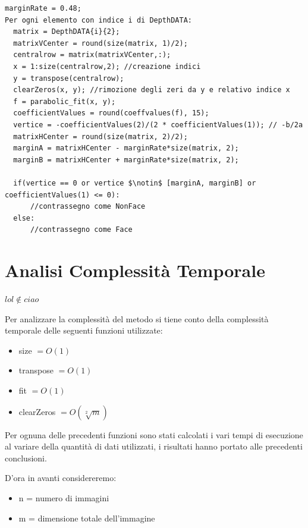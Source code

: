 \documentclass[
  italian,
]{article}
\providecommand{\tightlist}{%
  \setlength{\itemsep}{0pt}\setlength{\parskip}{0pt}}
\begin{document}
\begin{lstlisting}[basicstyle=\small, mathescape=true]
marginRate = 0.48;
Per ogni elemento con indice i di DepthDATA:
  matrix = DepthDATA{i}{2}; 
  matrixVCenter = round(size(matrix, 1)/2);
  centralrow = matrix(matrixVCenter,:);
  x = 1:size(centralrow,2); //creazione indici
  y = transpose(centralrow);
  clearZeros(x, y); //rimozione degli zeri da y e relativo indice x
  f = parabolic_fit(x, y);
  coefficientValues = round(coeffvalues(f), 15);
  vertice = -coefficientValues(2)/(2 * coefficientValues(1)); // -b/2a
  matrixHCenter = round(size(matrix, 2)/2);
  marginA = matrixHCenter - marginRate*size(matrix, 2);
  marginB = matrixHCenter + marginRate*size(matrix, 2);
  
  if(vertice == 0 or vertice $\notin$ [marginA, marginB] or coefficientValues(1) <= 0):
      //contrassegno come NonFace
  else:
      //contrassegno come Face
\end{lstlisting}


\hypertarget{analisi-complessituxe0-temporale}{%
\section{Analisi Complessità
Temporale}\label{analisi-complessituxe0-temporale}}

$lol \notin ciao$

Per analizzare la complessità del metodo si tiene conto della
complessità temporale delle seguenti funzioni utilizzate:

\begin{itemize}
\tightlist
\item
  size \(= O(1)\)
\item
  transpose \(= O(1)\)
\item
  fit \(= O(1)\)
\item
  clearZeros \(= O(\sqrt[2]{m}) \)
\end{itemize}

Per ognuna delle precedenti funzioni sono stati calcolati i vari tempi
di esecuzione al variare della quantità di dati utilizzati, i risultati
hanno portato alle precedenti conclusioni.

D'ora in avanti considereremo:

\begin{itemize}
\tightlist
\item
  n = numero di immagini
\item
  m = dimensione totale dell'immagine
\end{itemize}
\end{document}
